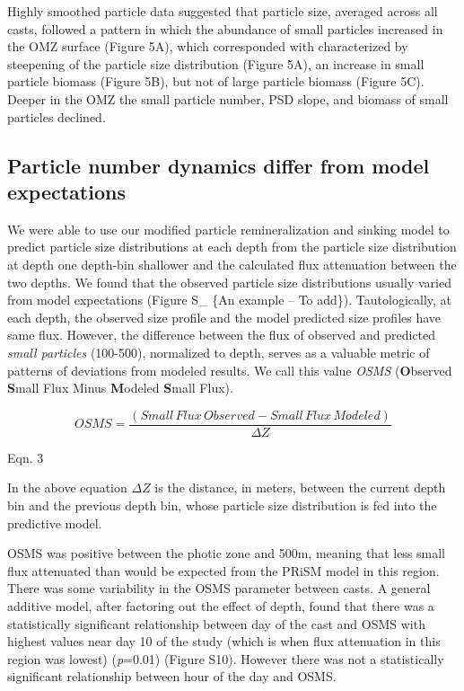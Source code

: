 \documentclass[]{article}
\begin{document}
Highly smoothed particle data suggested that particle size, averaged
across all casts, followed a pattern in which the abundance of small
particles increased in the OMZ surface (Figure 5A), which corresponded
with characterized by steepening of the particle size distribution
(Figure 5A), an increase in small particle biomass (Figure 5B), but not
of large particle biomass (Figure 5C). Deeper in the OMZ the small
particle number, PSD slope, and biomass of small particles declined.

\hypertarget{particle-number-dynamics-differ-from-model-expectations}{%
\subsection{Particle number dynamics differ from model
expectations}\label{particle-number-dynamics-differ-from-model-expectations}}

We were able to use our modified particle remineralization and sinking
model to predict particle size distributions at each depth from the
particle size distribution at depth one depth-bin shallower and the
calculated flux attenuation between the two depths. We found that the
observed particle size distributions usually varied from model
expectations (Figure S\_ \{An example -- To add\}). Tautologically, at
each depth, the observed size profile and the model predicted size
profiles have same flux. However, the difference between the flux of
observed and predicted \emph{small particles} (100-500), normalized to
depth, serves as a valuable metric of patterns of deviations from
modeled results. We call this value \emph{OSMS} (\textbf{O}bserved
\textbf{S}mall Flux Minus \textbf{M}odeled \textbf{S}mall Flux).

\[ OSMS = \frac{(Small\,Flux\,Observed - Small\,Flux\,Modeled)}{\Delta Z}\]

Eqn. 3

In the above equation \(\Delta Z\) is the distance, in meters, between
the current depth bin and the previous depth bin, whose particle size
distribution is fed into the predictive model.

OSMS was positive between the photic zone and 500m, meaning that less
small flux attenuated than would be expected from the PRiSM model in
this region. There was some variability in the OSMS parameter between
casts. A general additive model, after factoring out the effect of
depth, found that there was a statistically significant relationship
between day of the cast and OSMS with highest values near day 10 of the
study (which is when flux attenuation in this region was lowest)
(\emph{p}=0.01) (Figure S10). However there was not a statistically
significant relationship between hour of the day and OSMS.
\end{document}
